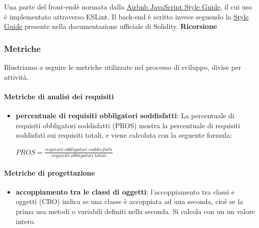 			Una parte del front-end\glosp è normata dalla \href{https://github.com/airbnb/javascript/blob/master/README.md}{Airbnb JavaScript Style Guide}, il cui uso è implementato attraverso ESLint\glo.\newline
			Il back-end è scritto invece seguendo la \href{https://solidity.readthedocs.io/en/v0.5.7/style-guide.html}{Style Guide} presente nella documentazione ufficiale di Solidity.
			 \newline \newline
			\noindent\textbf{Ricorsione}  \mbox{}\\
			
			
			
			
	\subsubsection{Metriche}
	Illustriamo a seguire le metriche utilizzate nel processo di sviluppo, divise per attività.
		\paragraph{Metriche di analisi dei requisiti}
		\begin{itemize}
			\item \textbf{percentuale di requisiti obbligatori soddisfatti}:
			La percentuale di requisiti obbligatori soddisfatti (PROS) mostra la percentuale di requisiti soddisfati sui requisiti totali, e viene calcolata con la seguente formula:	
			\begin{center}
				$ PROS = \frac{requisiti\ obbligatori\ soddisfatti}{requisiti\ obbligatori\ totali}$
			\end{center}		
		\end{itemize}		
		\paragraph{Metriche di progettazione}
		\begin{itemize}
			\item \textbf{accoppiamento tra le classi di oggetti}:
			l'accoppiamento tra classi e oggetti (CBO) indica se una classe è accoppiata ad una seconda, cioè se la prima usa metodi o variabili definiti nella seconda. Si calcola con un un valore intero.
		\end{itemize}
